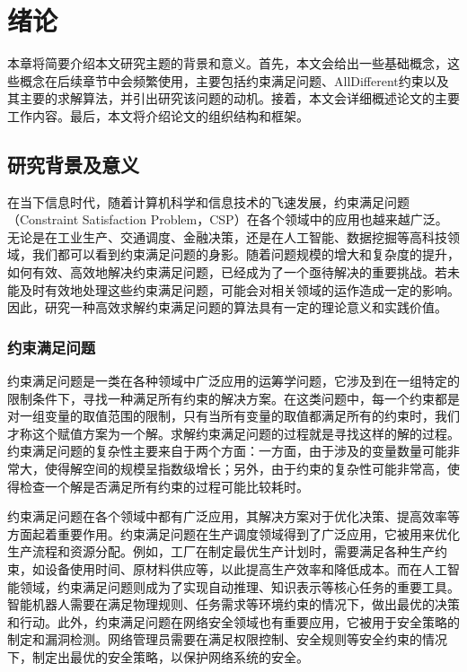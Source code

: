 \chapter{绪论}\label{chap:introduction}

本章将简要介绍本文研究主题的背景和意义。首先，本文会给出一些基础概念，这些概念在后续章节中会频繁使用，主要包括约束满足问题、AllDifferent约束以及其主要的求解算法，并引出研究该问题的动机。接着，本文会详细概述论文的主要工作内容。最后，本文将介绍论文的组织结构和框架。

\section{研究背景及意义}

在当下信息时代，随着计算机科学和信息技术的飞速发展，约束满足问题（Constraint Satisfaction Problem，CSP）在各个领域中的应用也越来越广泛。无论是在工业生产、交通调度、金融决策，还是在人工智能、数据挖掘等高科技领域，我们都可以看到约束满足问题的身影。随着问题规模的增大和复杂度的提升，如何有效、高效地解决约束满足问题，已经成为了一个亟待解决的重要挑战。若未能及时有效地处理这些约束满足问题，可能会对相关领域的运作造成一定的影响。因此，研究一种高效求解约束满足问题的算法具有一定的理论意义和实践价值。

\subsection{约束满足问题}
约束满足问题是一类在各种领域中广泛应用的运筹学问题，它涉及到在一组特定的限制条件下，寻找一种满足所有约束的解决方案。在这类问题中，每一个约束都是对一组变量的取值范围的限制，只有当所有变量的取值都满足所有的约束时，我们才称这个赋值方案为一个解。求解约束满足问题的过程就是寻找这样的解的过程。约束满足问题的复杂性主要来自于两个方面：一方面，由于涉及的变量数量可能非常大，使得解空间的规模呈指数级增长；另外，由于约束的复杂性可能非常高，使得检查一个解是否满足所有约束的过程可能比较耗时。

约束满足问题在各个领域中都有广泛应用，其解决方案对于优化决策、提高效率等方面起着重要作用。约束满足问题在生产调度领域得到了广泛应用，它被用来优化生产流程和资源分配。例如，工厂在制定最优生产计划时，需要满足各种生产约束，如设备使用时间、原材料供应等，以此提高生产效率和降低成本。而在人工智能领域，约束满足问题则成为了实现自动推理、知识表示等核心任务的重要工具。智能机器人需要在满足物理规则、任务需求等环境约束的情况下，做出最优的决策和行动。此外，约束满足问题在网络安全领域也有重要应用，它被用于安全策略的制定和漏洞检测。网络管理员需要在满足权限控制、安全规则等安全约束的情况下，制定出最优的安全策略，以保护网络系统的安全。

